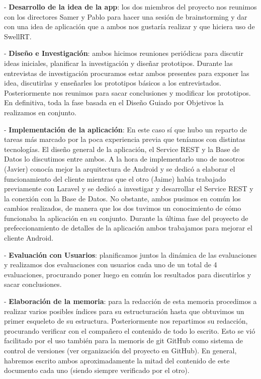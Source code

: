 - \textbf{Desarrollo de la idea de la app}: los dos miembros del proyecto nos reunimos con los directores Samer y Pablo para hacer una sesión de brainstorming y dar con una idea de aplicación que a ambos nos gustaría realizar y que hiciera uso de SwellRT.

- \textbf{Diseño e Investigación}: ambos hicimos reuniones periódicas para discutir ideas iniciales, planificar la investigación y diseñar prototipos. Durante las entrevistas de investigación procuramos estar ambos presentes para exponer las idea, discutirlas y enseñarles los prototipos básicos a los entrevistados. Posteriormente nos reunimos para sacar conclusiones y modificar los prototipos. En definitiva, toda la fase basada en el Diseño Guiado por Objetivos la realizamos en conjunto.

- \textbf{Implementación de la aplicación}: En este caso sí que hubo un reparto de tareas más marcado por la poca experiencia previa que teníamos con distintas tecnologías. El diseño general de la aplicación, el Service REST y la Base de Datos lo discutimos entre ambos. A la hora de implementarlo uno de nosotros (Javier) conocía mejor la arquitectura de Android y se dedicó a elaborar el funcionamiento del cliente mientras que el otro (Jaime) había trabajado previamente con Laravel y se dedicó a investigar y desarrollar el Service REST y la conexión con la Base de Datos. No obstante, ambos pusimos en común los cambios realizados, de manera que los dos tuvimos un conocimiento de cómo funcionaba la aplicación en su conjunto. Durante la última fase del proyecto de prefeccionamiento de detalles de la aplicación ambos trabajamos para mejorar el cliente Android.

- \textbf{Evaluación con Usuarios}: planificamos juntos la dinámica de las evaluaciones y realizamos dos evaluaciones con usuarios cada uno de un total de 4 evaluaciones, procurando poner luego en común los resultados para discutirlos y sacar conclusiones.

- \textbf{Elaboración de la memoria}: para la redacción de esta memoria procedimos a realizar varios posibles índices para su estructuración hasta que obtuvimos un primer esqueleto de su estructura. Posteriormente nos repartimos su redacción, procurando verificar con el compañero el contenido de todo lo escrito. Esto se vió facilitado por el uso también para la memoris de git  GitHub como sistema de control de versiones (ver organización del proyecto en GitHub). En general, habremos escrito ambos aproximadamente la mitad del contenido de este documento cada uno (siendo siempre verificado por el otro).

